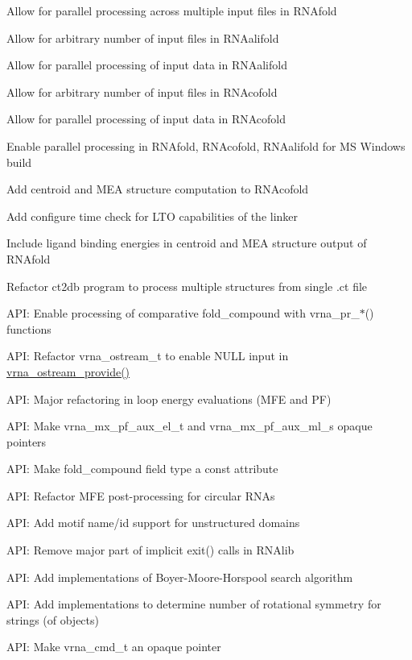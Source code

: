 \begin{DoxyItemize}
\item Allow for parallel processing across multiple input files in R\+N\+Afold
\item Allow for arbitrary number of input files in R\+N\+Aalifold
\item Allow for parallel processing of input data in R\+N\+Aalifold
\item Allow for arbitrary number of input files in R\+N\+Acofold
\item Allow for parallel processing of input data in R\+N\+Acofold
\item Enable parallel processing in R\+N\+Afold, R\+N\+Acofold, R\+N\+Aalifold for MS Windows build
\item Add centroid and M\+EA structure computation to R\+N\+Acofold
\item Add configure time check for L\+TO capabilities of the linker
\item Include ligand binding energies in centroid and M\+EA structure output of R\+N\+Afold
\item Refactor ct2db program to process multiple structures from single .ct file
\item A\+PI\+: Enable processing of comparative fold\+\_\+compound with vrna\+\_\+pr\+\_\+$\ast$() functions
\item A\+PI\+: Refactor vrna\+\_\+ostream\+\_\+t to enable N\+U\+LL input in \mbox{\hyperlink{group__buffer__utils_ga6253c42abdeaf3b41a38204865e1f0f7}{vrna\+\_\+ostream\+\_\+provide()}}
\item A\+PI\+: Major refactoring in loop energy evaluations (M\+FE and PF)
\item A\+PI\+: Make vrna\+\_\+mx\+\_\+pf\+\_\+aux\+\_\+el\+\_\+t and vrna\+\_\+mx\+\_\+pf\+\_\+aux\+\_\+ml\+\_\+s opaque pointers
\item A\+PI\+: Make fold\+\_\+compound field {\ttfamily type} a const attribute
\item A\+PI\+: Refactor M\+FE post-\/processing for circular R\+N\+As
\item A\+PI\+: Add motif name/id support for unstructured domains
\item A\+PI\+: Remove major part of implicit exit() calls in R\+N\+Alib
\item A\+PI\+: Add implementations of Boyer-\/\+Moore-\/\+Horspool search algorithm
\item A\+PI\+: Add implementations to determine number of rotational symmetry for strings (of objects)
\item A\+PI\+: Make vrna\+\_\+cmd\+\_\+t an opaque pointer

\end{DoxyItemize}
